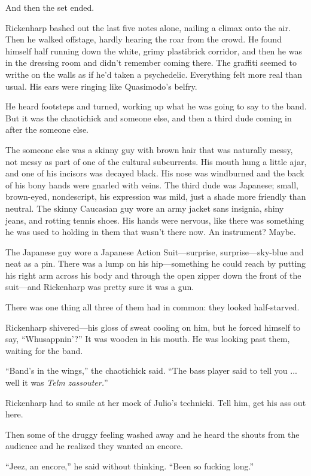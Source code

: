 And then the set ended.

Rickenharp bashed out the last five notes alone, nailing a climax onto the air. Then he walked offstage, hardly hearing the roar from the crowd. He found himself half running down the white, grimy plastibrick corridor, and then he was in the dressing room and didn't remember coming there. The graffiti seemed to writhe on the walls as if he'd taken a psychedelic. Everything felt more real than usual. His ears were ringing like Quasimodo's belfry.

He heard footsteps and turned, working up what he was going to say to the band. But it was the chaotichick and someone else, and then a third dude coming in after the someone else.

The someone else was a skinny guy with brown hair that was naturally messy, not messy as part of one of the cultural subcurrents. His mouth hung a little ajar, and one of his incisors was decayed black. His nose was windburned and the back of his bony hands were gnarled with veins. The third dude was Japanese; small, brown-eyed, nondescript, his expression was mild, just a shade more friendly than neutral. The skinny Caucasian guy wore an army jacket sans insignia, shiny jeans, and rotting tennis shoes. His hands were nervous, like there was something he was used to holding in them that wasn't there now. An instrument? Maybe.

The Japanese guy wore a Japanese Action Suit---surprise, surprise---sky-blue and neat as a pin. There was a lump on his hip---something he could reach by putting his right arm across his body and through the open zipper down the front of the suit---and Rickenharp was pretty sure it was a gun.

There was one thing all three of them had in common: they looked half-starved.

Rickenharp shivered---his gloss of sweat cooling on him, but he forced himself to say, ``Whusappnin'?'' It was wooden in his mouth. He was looking past them, waiting for the band.

``Band's in the wings,'' the chaotichick said. ``The bass player said to tell you ... well it was \textit{Telm zassouter.}''

Rickenharp had to smile at her mock of Julio's technicki. Tell him, get his ass out here.

Then some of the druggy feeling washed away and he heard the shouts from the audience and he realized they wanted an encore.

``Jeez, an encore,'' he said without thinking. ``Been so fucking long.''

